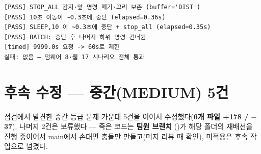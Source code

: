 \begin{verbatim}
[PASS] STOP_ALL 감지·앞 명령 폐기·꼬리 보존 (buffer='DIST')
[PASS] 10초 이동이 ~0.3초에 중단 (elapsed=0.36s)
[PASS] SLEEP,10 이 ~0.3초에 중단 + stop_all (elapsed=0.35s)
[PASS] BATCH: 중단 후 나머지 하위 명령 건너뜀
[timed] 9999.0s 요청 -> 60s로 제한
실패: 없음 — 펌웨어 8·웹 17 시나리오 전체 통과
\end{verbatim}

\section{후속 수정 — 중간(MEDIUM) 5건}
점검에서 발견한 중간 등급 문제 가운데 5건을 이어서 수정했다(\textbf{6개 파일 +178 / $-$37}).
나머지 2건은 보류했다 ---  죽은 코드는 \textbf{팀원 브랜치}
()가 해당 폴더의 재배선을 진행 중이어서 main에서 손대면 충돌만
만들고(머지 리뷰 때 확인),  미적용은 후속 작업으로 넘겼다.

\smallskip
{}

